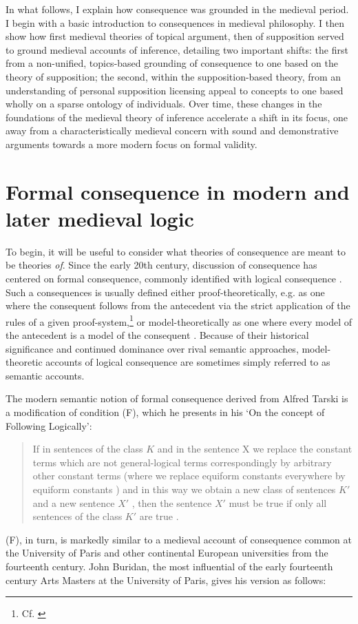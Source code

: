 \documentclass[a4paper, 11pt]{article}
\begin{document}
In what follows, I explain how consequence was grounded in the medieval period. I begin with a basic introduction to consequences in medieval philosophy. I then show how first medieval theories of topical argument, then of supposition served to ground medieval accounts of inference, detailing two important shifts: the first from a non-unified, topics-based grounding of consequence to one based on the theory of supposition; the second, within the supposition-based theory, from an understanding of personal supposition licensing appeal to concepts to one based wholly on a sparse ontology of individuals. Over time, these changes in the foundations of the medieval theory of inference accelerate a shift in its focus, one away from a characteristically medieval concern with sound and demonstrative arguments towards a more modern focus on formal validity.

\section{Formal consequence in modern and later medieval logic}
To begin, it will be useful to consider what theories of consequence are meant to be theories \emph{of}. Since the early 20th century, discussion of consequence has centered on formal consequence, commonly identified with logical consequence \autocite{Tarski2002,Gomez-Torrente2000}. Such a consequences is usually defined either proof-theoretically, e.g. as one where the consequent follows from the antecedent via the strict application of the rules of a given proof-system,\footnote{Cf. \autocite{Prawitz1985,Schroeder-Heister2006,Hjortland2009,Franks2010}} or model-theoretically as one where every model of the antecedent is a model of the consequent \autocite{Tarski2002}. Because of their historical significance and continued dominance over rival semantic approaches, model-theoretic accounts of logical consequence are sometimes simply referred to as semantic accounts.

The modern semantic notion of formal consequence derived from Alfred Tarski is a modification of condition (F), which he presents in his `On the concept of Following Logically':

\begin{quote}
  If in sentences of the class $K$ and in the sentence X we replace the constant terms which are not general-logical terms correspondingly by arbitrary other constant terms (where we replace equiform constants everywhere by equiform constants ) and in this way we obtain a new class of sentences $K'$ and a new sentence $X'$ , then the sentence $X'$ must be true if only all sentences of the class $K'$ are true \autocite[183-184]{Tarski2002}.
\end{quote} 
(F), in turn, is markedly similar to a medieval account of consequence common at the University of Paris and other continental European universities from the fourteenth century. John Buridan, the most influential of the early fourteenth century Arts Masters at the University of Paris, gives his version as follows: 
\end{document}

